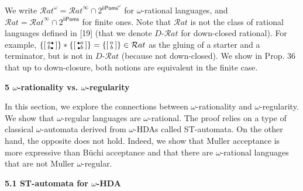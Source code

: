 \documentclass[10pt,a4paper]{article}
\begin{document}
We write ${\mathcal{R}at}^{\omega}={\mathcal{R}at}^{\infty}\cap 2^{\mathsf{iiPoms}^{\omega}}$ for $\omega$-rational languages, and $\mathcal{R}at={\mathcal{R}at}^{\infty}\cap 2^{\mathsf{iiPoms}}$ for finite ones. Note that $\mathcal{R}at$ is not the class of rational languages defined in [19] (that we denote $D\text{-}\mathcal{R}at$ for down-closed rational). For example, ${\{\left[\begin{smallmatrix}a\vbox{\hbox{\tiny$\bullet$}}\\
b\vbox{\hbox{\tiny$\bullet$}}\end{smallmatrix}\right]\}}*{\{\left[\begin{smallmatrix}\vbox{\hbox{\tiny$\bullet$}}a\\
\vbox{\hbox{\tiny$\bullet$}}b\end{smallmatrix}\right]\}}={\{\left[\begin{smallmatrix}a\\
b\end{smallmatrix}\right]\}}\in\mathcal{R}at$ as the gluing of a starter and a terminator, but is not in $D\text{-}\mathcal{R}at$ (because not down-closed). We show in Prop. 36 that up to down-closure, both notions are equivalent in the finite case.\par
 
 


 
\par\medskip\noindent\textbf{5 $\omega$-rationality vs. $\omega$-regularity}\par
 
 
In this section, we explore the connections between $\omega$-rationality and $\omega$-regularity. We show that $\omega$-regular languages are $\omega$-rational. The proof relies on a type of classical $\omega$-automata derived from $\omega$-HDAs called ST-automata. On the other hand, the opposite does not hold. Indeed, we show that Muller acceptance is more expressive than Büchi acceptance and that there are $\omega$-rational languages that are not Muller $\omega$-regular.\par
 
 
 
\par\medskip\noindent\textbf{5.1 ST-automata for $\omega$-HDA}\par
 
\end{document}
